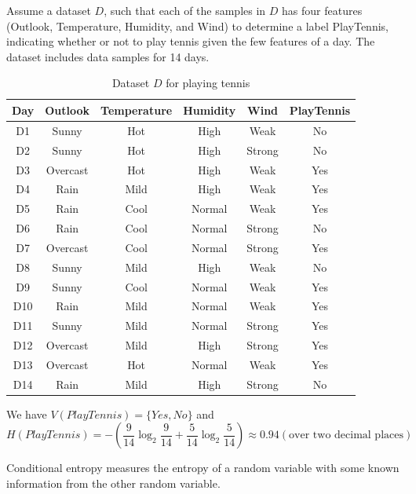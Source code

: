 \begin{example}\label{example:tennis}
Assume a dataset $D$, such that each of the samples in $D$ has four features (Outlook, Temperature, Humidity, and Wind) to determine a label PlayTennis, indicating whether or not to play tennis given the few features of a day. The dataset includes data samples for 14 days. 
\begin{table}[h!]
    \centering
    \begin{tabular}{|c||c|c|c|c||c|}
    \hline
       Day  & Outlook & Temperature & Humidity & Wind & PlayTennis\\
       \hline
       D1  & Sunny & Hot & High & Weak & No \\
       D2  & Sunny & Hot & High & Strong & No \\
       D3  & Overcast & Hot & High & Weak & Yes \\
       D4  & Rain & Mild & High & Weak & Yes \\
       D5  & Rain & Cool & Normal & Weak & Yes \\
       D6  & Rain & Cool & Normal & Strong & No \\
       D7  & Overcast & Cool & Normal & Strong & Yes \\
       D8  & Sunny & Mild & High & Weak & No \\
       D9  & Sunny & Cool & Normal & Weak & Yes \\
       D10  & Rain & Mild & Normal & Weak & Yes \\
       D11  & Sunny & Mild & Normal & Strong & Yes \\
       D12  & Overcast & Mild & High & Strong & Yes \\
       D13  & Overcast & Hot & Normal & Weak & Yes \\
       D14  & Rain & Mild & High & Strong & No \\
\hline
    \end{tabular}
    \caption{Dataset $D$ for playing tennis}
    \label{tab:my_label}
\end{table}
We have $V(PlayTennis)=\{Yes, No\}$ and 
\begin{equation}
    H(PlayTennis)=- (\frac{9}{14}\log_2 \frac{9}{14} + \frac{5}{14}\log_2 \frac{5}{14}) \approx 0.94 (\text{over two decimal places})
\end{equation}
\end{example}

Conditional entropy measures the entropy of a random variable with some known information from the other random variable. 


